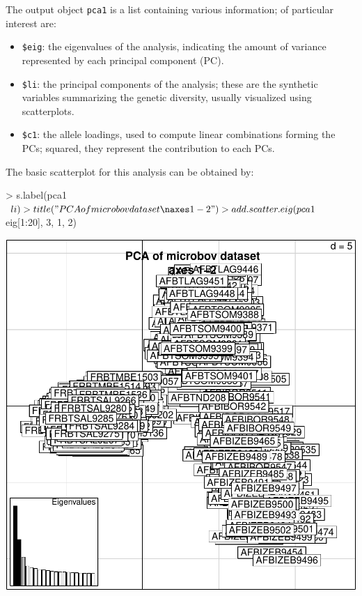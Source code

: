 \documentclass{article}
\begin{document}
The output object \texttt{pca1} is a list containing various information; of particular interest are:
\begin{itemize}
\item \texttt{\$eig}: the eigenvalues of the analysis, indicating the amount of variance represented
  by each principal component (PC).
\item \texttt{\$li}: the principal components of the analysis; these are the synthetic variables
  summarizing the genetic diversity, usually visualized using scatterplots.
\item \texttt{\$c1}: the allele loadings, used to compute linear combinations forming the PCs;
  squared, they represent the contribution to each PCs.
\end{itemize}

The basic scatterplot for this analysis can be obtained by:
\begin{Schunk}
\begin{Sinput}
> s.label(pca1$li)
> title("PCA of microbov dataset\naxes 1-2")
> add.scatter.eig(pca1$eig[1:20], 3, 1, 2)
\end{Sinput}
\end{Schunk}
\includegraphics{figs/base-075}
\end{document}
